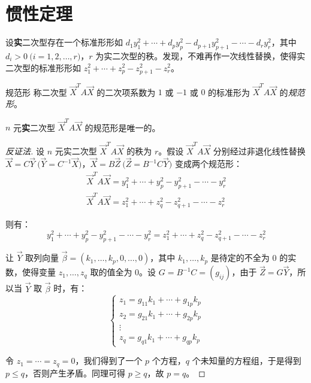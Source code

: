 
\section{惯性定理}

设\textbf{实}二次型存在一个标准形形如 $d_1 y_1^2 + \cdots + d_p y_p^2 - d_{p + 1}y_{p + 1}^2 - \cdots - d_r y_r^2$，其中 $d_i > 0 \pod{i = 1, 2, \ldots, r}$，$r$ 为实二次型的秩。发现，不难再作一次线性替换，使得实二次型的标准形形如 $z_1^2 + \cdots + z_p^2 - z_{p + 1}^2 - z_r^2$。

\begin{definition}{规范形}
	称二次型 $\vec X^T A \vec X$ 的二次项系数为 $1$ 或 $-1$ 或 $0$ 的标准形为 $\vec X^T A \vec X$ 的\emph{规范形}。
\end{definition}

\begin{theorem}[惯性定理]
	$n$ 元\textbf{实}二次型 $\vec X^T A \vec X$ 的规范形是唯一的。
\end{theorem}

\begin{proof}[反证法]
	设 $n$ 元实二次型 $\vec X^T A \vec X$ 的秩为 $r$。假设 $\vec X^T A \vec X$ 分别经过非退化线性替换 $\vec X = C \vec Y \pod{\vec Y = C^{-1} \vec X}$，$\vec X = B \vec Z \pod{\vec Z = B^{-1}C \vec Y}$ 变成两个规范形：
	$$
	\begin{gathered}
		\vec X^T A \vec X = y_1^2 + \cdots + y_p^2 -y_{p + 1}^2 - \cdots - y_r^2
		\\
		\vec X^T A \vec X = z_1^2 + \cdots + z_q^2 - z_{q + 1}^2 - \cdots - z_r^2
	\end{gathered}
	$$

	则有：
	$$
	y_1^2 + \cdots + y_p^2 - y_{p + 1}^2 - \cdots - y_r^2 = z_1^2 + \cdots + z_q^2 - z_{q + 1}^2 - \cdots - z_r^2
	$$

	让 $\vec Y$ 取列向量 $\vec \beta = (k_1, \ldots, k_p, 0, \ldots, 0)$，其中 $k_1, \ldots, k_p$ 是待定的不全为 $0$ 的实数，使得变量 $z_1, \ldots, z_q$ 取的值全为 $0$。设 $G = B^{-1} C = (g_{ij})$，由于 $\vec Z = G \vec Y$，所以当 $\vec Y$ 取 $\vec \beta$ 时，有：
	$$
	\begin{cases}
	z_1 = g_{11} k_1 + \cdots + g_{1p} k_p
	\\
	z_2 = g_{21} k_1 + \cdots + g_{2p} k_p
	\\
	\vdots
	\\
	z_q = g_{q1} k_1 + \cdots + g_{qp} k_p
	\end{cases}
	$$

	令 $z_1 = \cdots = z_q = 0$，我们得到了一个 $p$ 个方程，$q$ 个未知量的方程组，于是得到 $p \le q$，否则产生矛盾。同理可得 $p \ge q$，故 $p = q$。
\end{proof}

